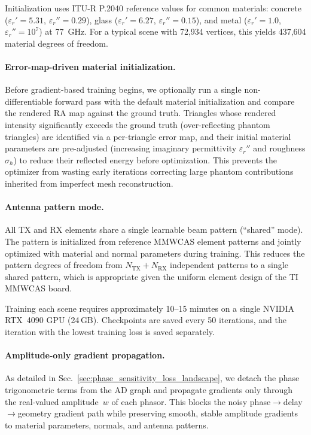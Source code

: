 Initialization uses ITU-R P.2040 reference values for common materials: concrete ($\varepsilon_r' = 5.31$, $\varepsilon_r'' = 0.29$), glass ($\varepsilon_r' = 6.27$, $\varepsilon_r'' = 0.15$), and metal ($\varepsilon_r' = 1.0$, $\varepsilon_r'' = 10^7$) at 77~GHz. For a typical scene with 72,934 vertices, this yields 437,604 material degrees of freedom.

\paragraph{Error-map-driven material initialization.}
Before gradient-based training begins, we optionally run a single non-differentiable forward pass with the default material initialization and compare the rendered RA map against the ground truth. Triangles whose rendered intensity significantly exceeds the ground truth (over-reflecting phantom triangles) are identified via a per-triangle error map, and their initial material parameters are pre-adjusted (increasing imaginary permittivity $\varepsilon_r''$ and roughness $\sigma_h$) to reduce their reflected energy before optimization. This prevents the optimizer from wasting early iterations correcting large phantom contributions inherited from imperfect mesh reconstruction.

\paragraph{Antenna pattern mode.}
All TX and RX elements share a single learnable beam pattern (``shared'' mode). The pattern is initialized from reference MMWCAS element patterns and jointly optimized with material and normal parameters during training. This reduces the pattern degrees of freedom from $N_\text{TX} + N_\text{RX}$ independent patterns to a single shared pattern, which is appropriate given the uniform element design of the TI MMWCAS board.

Training each scene requires approximately 10--15 minutes on a single NVIDIA RTX~4090 GPU (24\,GB). Checkpoints are saved every 50 iterations, and the iteration with the lowest training loss is saved separately.

\paragraph{Amplitude-only gradient propagation.}
As detailed in Sec.~\ref{sec:phase_sensitivity_loss_landscape}, we detach the phase trigonometric terms from the AD graph and propagate gradients only through the real-valued amplitude~$w$ of each phasor. This blocks the noisy phase$\to$delay$\to$geometry gradient path while preserving smooth, stable amplitude gradients to material parameters, normals, and antenna patterns.

